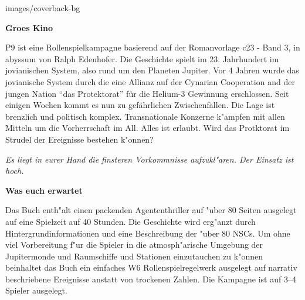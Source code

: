 \begin{backcover}{images/coverback-bg}
    
    \vspace{5mm}
    \textbf{Gro\3es Kino}

    P9 ist eine Rollenspielkampagne basierend auf der Romanvorlage c23 - Band 3, in abyssum von Ralph Edenhofer. Die Geschichte spielt im 23. Jahrhundert im jovianischen System, also rund um den Planeten Jupiter. Vor 4 Jahren wurde das jovianische System durch die eine Allianz auf der Cynarian Cooperation and der jungen Nation "`das Protektorat"' für die Helium-3 Gewinnung erschlossen. Seit einigen Wochen kommt es nun zu gefährlichen Zwischenfällen. Die Lage ist brenzlich und politisch komplex. Transnationale Konzerne k"ampfen mit allen Mitteln um die Vorherrschaft im All. Alles ist erlaubt. Wird das Protktorat im Strudel der Ereignisse bestehen k"onnen?
    
    \medskip
    \emph{Es liegt in eurer Hand die finsteren Vorkommnisse aufzukl"aren. Der Einsatz ist hoch.}

    \vspace{5mm}
    \textbf{Was euch erwartet}

    Das Buch enth"alt einen packenden Agententhriller auf "uber 80 Seiten ausgelegt auf eine Spielzeit auf 40 Stunden. Die Geschichte wird erg"anzt durch Hintergrundinformationen und eine Beschreibung der "uber 80 NSCs. Um ohne viel Vorbereitung f"ur die Spieler in die atmosph"arische Umgebung der Jupitermonde und Raumschiffe und Stationen einzutauchen zu k"onnen beinhaltet das Buch ein einfaches W6 Rollenspielregelwerk ausgelegt auf narrativ beschriebene Ereignisse anstatt von trockenen Zahlen.    Die Kampagne ist auf 3--4 Spieler ausgelegt.
\end{backcover}
